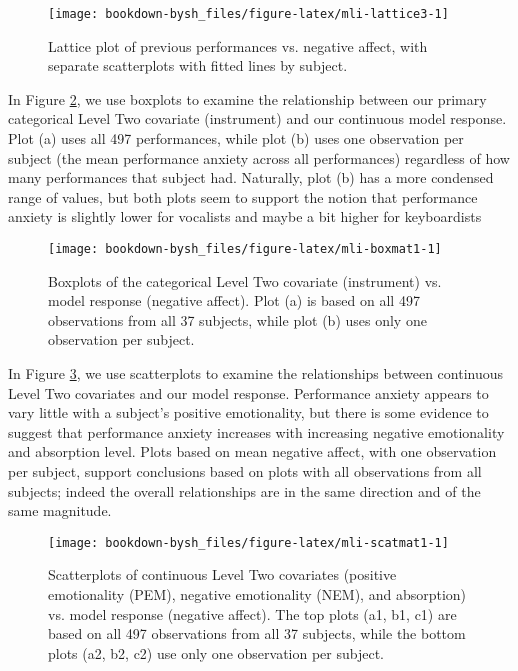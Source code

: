 \documentclass[
]{krantz}
\begin{document}
\begin{figure}

{\centering \texttt{[image: bookdown-bysh\_files/figure-latex/mli-lattice3-1]} 

}

\caption{Lattice plot of previous performances vs. negative affect, with separate scatterplots with fitted lines by subject.}\label{fig:mli-lattice3}
\end{figure}

In Figure \ref{fig:mli-boxmat1}, we use boxplots to examine the relationship between our primary categorical Level Two covariate (instrument) and our continuous model response. Plot (a) uses all 497 performances, while plot (b) uses one observation per subject (the mean performance anxiety across all performances) regardless of how many performances that subject had. Naturally, plot (b) has a more condensed range of values, but both plots seem to support the notion that performance anxiety is slightly lower for vocalists and maybe a bit higher for keyboardists

\begin{figure}

{\centering \texttt{[image: bookdown-bysh\_files/figure-latex/mli-boxmat1-1]} 

}

\caption{Boxplots of the categorical Level Two covariate (instrument) vs. model response (negative affect).  Plot (a) is based on all 497 observations from all 37 subjects, while plot (b) uses only one observation per subject.}\label{fig:mli-boxmat1}
\end{figure}

In Figure \ref{fig:mli-scatmat1}, we use scatterplots to examine the relationships between continuous Level Two covariates and our model response. Performance anxiety appears to vary little with a subject's positive emotionality, but there is some evidence to suggest that performance anxiety increases with increasing negative emotionality and absorption level. Plots based on mean negative affect, with one observation per subject, support conclusions based on plots with all observations from all subjects; indeed the overall relationships are in the same direction and of the same magnitude.

\begin{figure}

{\centering \texttt{[image: bookdown-bysh\_files/figure-latex/mli-scatmat1-1]} 

}

\caption{ Scatterplots of continuous Level Two covariates (positive emotionality (PEM), negative emotionality (NEM), and absorption) vs. model response (negative affect).  The top plots (a1, b1, c1) are based on all 497 observations from all 37 subjects, while the bottom plots (a2, b2, c2) use only one observation per subject.}\label{fig:mli-scatmat1}
\end{figure}
\end{document}
